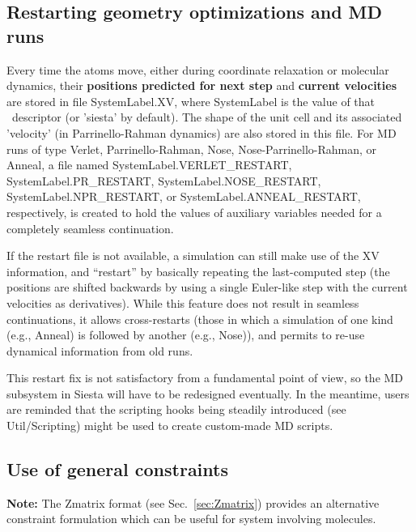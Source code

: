 \subsection{Restarting geometry optimizations and MD runs}

Every time the atoms move, either during coordinate relaxation or
molecular dynamics, their \textbf{positions predicted for next step} and
\textbf{current velocities} are stored in file SystemLabel.XV, where
SystemLabel is the value of that \fdflib\ descriptor (or 'siesta' by
default).  The shape of the unit cell and its associated 'velocity'
(in Parrinello-Rahman dynamics) are also stored in this file. For MD
runs of type Verlet, Parrinello-Rahman, Nose, 
Nose-Parrinello-Rahman, or Anneal, a file named SystemLabel.VERLET\_RESTART,
SystemLabel.PR\_RESTART, SystemLabel.NOSE\_RESTART, 
SystemLabel.NPR\_RESTART, or SystemLabel.ANNEAL\_RESTART, 
respectively, is created to hold the values
of auxiliary variables needed for a completely seamless
continuation. 

If the restart file is not available, a simulation can still make use
of the XV information, and ``restart'' by basically repeating the
last-computed step (the positions are shifted backwards by using a
single Euler-like step with the current velocities as derivatives).
While this feature does not result in seamless continuations, it
allows cross-restarts (those in which a simulation of one kind (e.g.,
Anneal) is followed by another (e.g., Nose)), and permits 
to re-use dynamical information from old runs.

This restart fix is not satisfactory from a fundamental point of view,
so the MD subsystem in Siesta will have to be redesigned
eventually. In the meantime, users are reminded that the scripting
hooks being steadily introduced (see Util/Scripting) might be used to
create custom-made MD scripts.


\subsection{Use of general constraints}

\textbf{Note:} The Zmatrix format (see Sec.~\ref{sec:Zmatrix}) provides
an alternative constraint formulation which can be useful for system
involving molecules.

